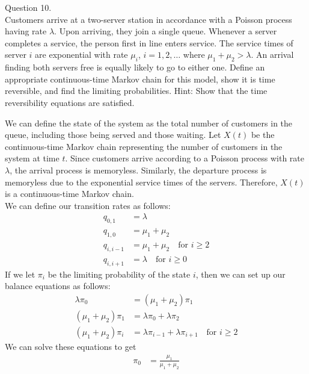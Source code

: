 \documentclass[answers,12pt,addpoints]{exam}
\begin{document}
\begin{questions}
\begin{solution}
    \end{solution}
    \question Question 10.\\
    Customers arrive at a two-server station in accordance with a Poisson process having rate $\lambda$. Upon
    arriving, they join a single queue. Whenever a server completes a service, the person first in
    line enters service. The service times of server $i$ are exponential with rate $\mu_i$, $i = 1, 2, \ldots$ where
    $\mu_1 + \mu_2 > \lambda$. An arrival finding both servers free is equally likely to go to either one. Define an
    appropriate continuous-time Markov chain for this model, show it is time reversible, and find the
    limiting probabilities.
    Hint: Show that the time reversibility equations are satisfied.
    \begin{solution}
        We can define the state of the system as the total number of customers in the queue, including those being served and those waiting. Let \(X(t)\) be the continuous-time Markov chain representing the number of customers in the system at time \(t\). Since customers arrive according to a Poisson process with rate \(\lambda\), the arrival process is memoryless. Similarly, the departure process is memoryless due to the exponential service times of the servers. Therefore, \(X(t)\) is a continuous-time Markov chain.\\
        We can define our transition rates as follows:
        \begin{align*}
            q_{0,1} &= \lambda\\
            q_{1,0} &= \mu_1 + \mu_2\\
            q_{i,i-1} &= \mu_1 + \mu_2 \quad \text{for } i \geq 2\\
            q_{i,i+1} &= \lambda \quad \text{for } i \geq 0
        \end{align*}
        If we let $\pi_i$ be the limiting probability of the state $i$, then we can set up our balance equations as follows:
        \begin{align*}
            \lambda \pi_0 &= (\mu_1 + \mu_2) \pi_1\\
            (\mu_1 + \mu_2) \pi_1 &= \lambda \pi_0 + \lambda \pi_2\\
            (\mu_1 + \mu_2) \pi_i &= \lambda \pi_{i-1} + \lambda \pi_{i+1} \quad \text{for } i \geq 2
        \end{align*}
        We can solve these equations to get
        \begin{align*}
            \pi_0 &= \frac{\mu_1}{\mu_1 + \mu_2}\\

\end{align*}
\end{solution}
\end{questions}
\end{document}
